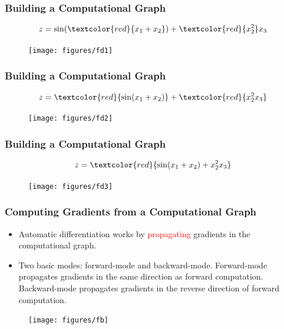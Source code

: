 \documentclass{beamer}
\newcommand{\red}[1]{\textcolor{red}{#1}}
\begin{document}
\begin{frame}
	\frametitle{Building a Computational Graph}
	
	$$z=\sin(\red{x_1+x_2}) + \red{x_2^2}x_3$$
	
	\begin{figure}[hbt]
  \texttt{[image: figures/fd1]}
\end{figure}

	
\end{frame}


\begin{frame}
	\frametitle{Building a Computational Graph}
	
	$$z=\red{\sin(x_1+x_2)} + \red{x_2^2x_3}$$
	
	\begin{figure}[hbt]
  \texttt{[image: figures/fd2]}
\end{figure}
\end{frame}

\begin{frame}
	\frametitle{Building a Computational Graph}
	
	$$z=\red{\sin(x_1+x_2) + x_2^2x_3}$$
	
	\begin{figure}[hbt]
  \texttt{[image: figures/fd3]}
\end{figure}
\end{frame}



\begin{frame}
	\frametitle{Computing Gradients from a Computational Graph}
	\begin{itemize}
		\item Automatic differentiation works by \textcolor{red}{propagating} gradients in the computational graph. 
		\item Two basic modes: forward-mode and backward-mode. Forward-mode propagates gradients in the same direction as forward computation. Backward-mode propagates gradients in the reverse direction of forward computation. 
		\end{itemize}
		\begin{figure}[hbt]
		\centering
  \texttt{[image: figures/fb]}
\end{figure}

\end{frame}
\end{document}
